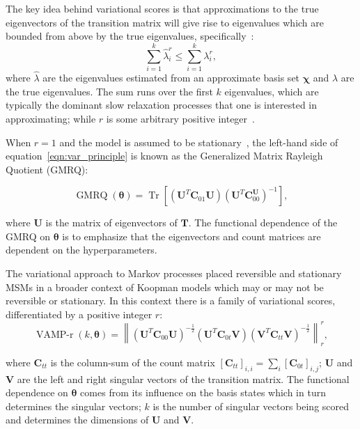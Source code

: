 \documentclass[journal=jacsat,manuscript=article]{achemso}
\begin{document}
The key idea behind variational scores is that approximations to the true eigenvectors of the transition matrix will give rise to eigenvalues which are bounded from above by the true eigenvalues, specifically~\cite{mcgibbonVariationalCrossvalidationSlow2015, wuVariationalApproachLearning2020c}: 
\begin{equation}\label{eqn:var_principle}
    \sum_{i=1}^{k}\hat{\lambda}_{i}^{r} \leq \sum_{i=1}^{k}\lambda_{i}^{r},
\end{equation}
where $\hat{\lambda}$ are the eigenvalues estimated from an approximate basis set $\bm{\chi}$ and $\lambda$ are the true eigenvalues. The sum runs over the first $k$ eigenvalues, which are typically the dominant slow relaxation processes that one is interested in approximating; while $r$ is some arbitrary positive integer~\cite{wuVariationalApproachLearning2020c}.

When $r=1$ and the model is assumed to be stationary~\cite{mcgibbonVariationalCrossvalidationSlow2015}, the left-hand side of equation~\ref{eqn:var_principle} is known as the Generalized Matrix Rayleigh Quotient (GMRQ):

\begin{equation}
    \operatorname{GMRQ}(\bm{\theta}) = \operatorname{Tr}\left[(\mathbf{U}^{T}\mathbf{C}_{01}\mathbf{U})(\mathbf{U}^{T}\mathbf{C}_{00}^\mathbf{U})^{-1}\right], \label{eqn:gmrq_def}
\end{equation}

where $\mathbf{U}$ is the matrix of eigenvectors of $\mathbf{T}$. The functional dependence of the GMRQ on $\bm{\theta}$ is to emphasize that the eigenvectors and count matrices are dependent on the hyperparameters. 

The variational approach to Markov processes placed reversible and stationary MSMs in a broader context of Koopman models which may or may not be reversible or stationary.  In this context there is a family of variational scores, differentiated by a positive integer $r$: 
\begin{equation}
     \operatorname{VAMP-r}(k, \bm{\theta}) = \left \| (\mathbf{U}^{T}\mathbf{C}_{00}\mathbf{U})^{-\frac{1}{2}}(\mathbf{U}^{T}\mathbf{C}_{0t}\mathbf{V})(\mathbf{V}^{T}\mathbf{C}_{tt}\mathbf{V})^{-\frac{1}{2}} \right \|_{r}^{r}, \label{eqn:vamp_def}
\end{equation}

where $\mathbf{C}_{tt}$ is the column-sum of the count matrix $[\mathbf{C}_{tt}]_{i, i} = \sum_i [\mathbf{C}_{0t}]_{i, j}$; $\mathbf{U}$ and $\mathbf{V}$ are the left and right singular vectors of the transition matrix. The functional dependence on $\bm{\theta}$ comes from its influence on the basis states which in turn determines the singular vectors; $k$ is the number of singular vectors being scored and determines the dimensions of $\mathbf{U}$ and $\mathbf{V}$.  
\end{document}
